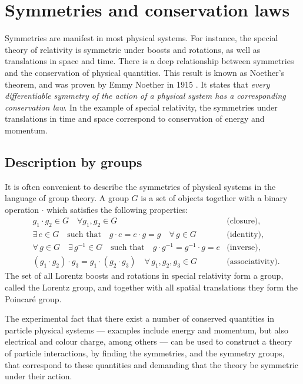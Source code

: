 \documentclass[twoside,english]{uiofysmaster}
\begin{document}
\section{Symmetries and conservation laws}
Symmetries are manifest in most physical systems. For instance, the special theory of relativity is symmetric under boosts and rotations, as well as translations in space and time. There is a deep relationship between symmetries and the conservation of physical quantities. This result is known as Noether's theorem, and was proven by Emmy Noether in 1915 \cite{Noether:1918zz}. It states that {\it every differentiable symmetry of the action of a physical system has a corresponding conservation law}. In the example of special relativity, the symmetries under translations in time and space correspond to conservation of energy and momentum.%

\subsection{Description by groups}
It is often convenient to describe the symmetries of physical systems in the language of group theory. A group $G$ is a set of objects together with a binary operation $\cdot$ which satisfies the following properties:
\begin{align}
  &g_1\cdot g_2 \in G \quad \forall g_1, g_2 \in G &\text{(closure)},\\
  &\exists \, e \in G \quad \text{such that} \quad g\cdot e = e \cdot g = g \quad \forall \, g \in G &\text{(identity)},\\
  &\forall \, g \in G \quad \exists \, g^{-1} \in G \quad \text{such that} \quad g\cdot g^{-1} = g^{-1}\cdot g = e &\text{(inverse)},\\
  &(g_1\cdot g_2)\cdot g_3 = g_1\cdot(g_2\cdot g_3) \quad \forall \, g_1, g_2, g_3 \in G &\text{(associativity)}.
\end{align}
The set of all Lorentz boosts and rotations in special relativity form a group, called the Lorentz group, and together with all spatial translations they form the Poincar\'{e} group. 

The experimental fact that there exist a number of conserved quantities in particle physical systems --- examples include energy and momentum, but also electrical and colour charge, among others --- can be used to construct a theory of particle interactions, by finding the symmetries, and the symmetry groups, that correspond to these quantities and demanding that the theory be symmetric under their action.
\end{document}

